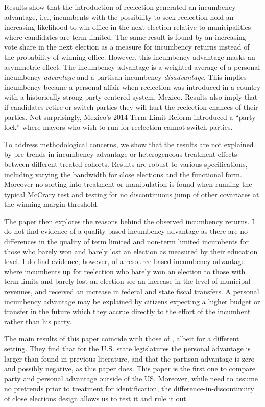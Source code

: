 Results show that the introduction of reelection generated an incumbency advantage, i.e., incumbents with the possibility to seek reelection hold an increasing likelihood to win office in the next election relative to municipalities where candidates are term limited. The same result is found by an increasing vote share in the next election as a measure for incumbency returns instead of the probability of winning office. However, this incumbency advantage masks an asymmetric effect. The incumbency advantage is a weighted average of a personal incumbency \emph{advantage} and a partisan incumbency \emph{disadvantage}. This implies incumbency became a personal affair when reelection was introduced in a country with a historically strong party-centered system, Mexico. Results also imply that if candidates retire or switch parties they will hurt the reelection chances of their parties. Not surprisingly, Mexico's 2014 Term Limit Reform introduced a ``party lock'' where mayors who wish to run for reelection cannot switch parties.  

To address  methodological concerns, we show that the results are not explained by pre-trends in incumbency advantage or heterogeneous treatment effects between different treated cohorts. Results are robust to various specifications, including varying the bandwidth for close elections and the functional form. Moreover no sorting into treatment or manipulation is found when running the typical McCrary test and testing for no discontinuous jump of other covariates at the winning margin threshold. 

The paper then explores the reasons behind the observed incumbency returns. I do not find evidence of a quality-based incumbency advantage as there are no differences in the quality of term limited and non-term limited incumbents for those who barely won and barely lost an election as measured by their education level. I do find evidence, however, of a resource based incumbency advantage where incumbents up for reelection who barely won an election to those with term limits and barely lost an election see an increase in the level of municipal revenues, and received an increase in federal and state fiscal transfers. A personal incumbency advantage may be explained by citizens expecting a higher budget or transfer in the future which they accrue directly to the effort of the incumbent rather than his party.

The main results of this paper coincide with those of \citet{fowler_hall_2014}, albeit for a different setting. They find that for the U.S. state legislatures the personal advantage is larger than found in previous literature, and that the partisan advantage is zero and possibly negative, as this paper does. This paper is the first one to compare party and personal advantage outside of the US. Moreover, while \citet{fowler_hall_2014} need to assume no pretrends prior to treatment for identification, the difference-in-discontinuity of close elections design allows us to test it and rule it out. 

